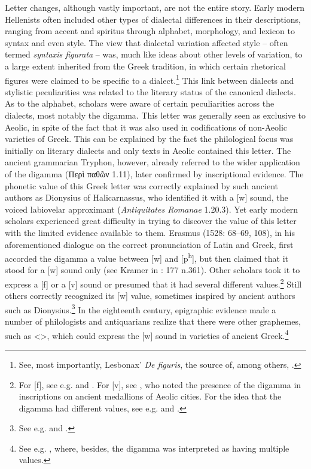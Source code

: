 Letter changes, although vastly important, are not the entire story. Early modern Hellenists often included other types of dialectal differences in their descriptions, ranging from accent and spiritus through alphabet, morphology, and lexicon to syntax and even style. The view that dialectal variation affected style – often termed \textit{syntaxis figurata} – was, much like ideas about other levels of variation, to a large extent inherited from the Greek tradition, in which certain rhetorical figures were claimed to be specific to a dialect.\footnote{{See, most importantly, Lesbonax’} {\textit{De figuris}}{, the source of, among others, \citet[145-146]{Saumaise1643a}.}} This link between dialects and stylistic peculiarities was related to the literary status of the canonical dialects. As to the alphabet, scholars were aware of certain peculiarities across the dialects, most notably the digamma. This letter was generally seen as exclusive to Aeolic, in spite of the fact that it was also used in codifications of non-Aeolic varieties of Greek. This can be explained by the fact the philological focus was initially on literary dialects and only texts in Aeolic contained this letter. The ancient grammarian Tryphon, however, already referred to the wider application of the digamma (Περὶ παθῶν 1.11), later confirmed by inscriptional evidence. The phonetic value of this Greek letter was correctly explained by such ancient authors as Dionysius of Halicarnassus, who identified it with a [w] sound, the voiced labiovelar approximant (\textit{Antiquitates Romanae} 1.20.3). Yet early modern scholars experienced great difficulty in trying to discover the value of this letter with the limited evidence available to them. Erasmus (1528: 68–69, 108), in his aforementioned dialogue on the correct pronunciation of Latin and Greek, first accorded the digamma a value between [w] and [p\textsuperscript{h}], but then claimed that it stood for a [w] sound only (see Kramer in \citealt{Erasmus1978}: 177 n.361). Other scholars took it to express a [f] or a [v] sound or presumed that it had several different values.\footnote{{For [f], see e.g. \citet[4]{Sylvius1531} and \citet[5]{Rhenius1626}. For [v], see \citet[108-109]{Freret1809}, who noted the presence of the digamma in inscriptions on ancient medallions of Aeolic cities. For the idea that the digamma had different values, see e.g. \citet[107-108]{Canini1555} and \citet[b.1{\textsc{\textsuperscript{r}}}{–b.2}{\textsc{\textsuperscript{v}}}]{ThryllitschBrunner1709}.}} Still others correctly recognized its [w] value, sometimes inspired by ancient authors such as Dionysius.\footnote{{See e.g. \citet[b.4{\textsc{\textsuperscript{r}}}]{KirchmaierCrusius1684} and \citet[19]{Reynolds1752}.}} In the eighteenth century, epigraphic evidence made a number of philologists and antiquarians realize that there were other graphemes, such as <{\sqsubset}>, which could express the [w] sound in varieties of ancient Greek.\footnote{{See e.g. \citet[128-130]{Mazzocchi1754}, where, besides, the digamma was interpreted as having multiple values.}}


